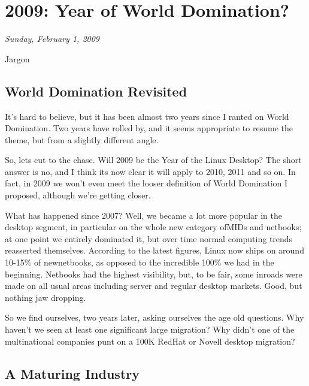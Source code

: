 \documentclass{memoir}
\begin{document}
\chapter{2009: Year of World Domination?}

\begin{flushright}
  \emph{Sunday, February 1, 2009}
\end{flushright}

\begin{epigraphs}
      {Jargon}
\end{epigraphs}

\section{World Domination Revisited}

It's hard to believe, but it has been almost two years since I ranted
on World Domination. Two years have rolled by, and it seems
appropriate to resume the theme, but from a slightly different angle.

So, lets cut to the chase. Will 2009 be the Year of the Linux Desktop?
The short answer is no, and I think its now clear it will apply to
2010, 2011 and so on. In fact, in 2009 we won't even meet the looser
definition of World Domination I proposed, although we're getting
closer.

What has happened since 2007? Well, we became a lot more popular in
the desktop segment, in particular on the whole new category ofMIDs
and netbooks; at one point we entirely dominated it, but over time
normal computing trends reasserted themselves. According to the latest
figures, Linux now ships on around 10-15\% of newnetbooks, as opposed
to the incredible 100\% we had in the beginning. Netbooks had the
highest visibility, but, to be fair, some inroads were made on all
usual areas including server and regular desktop markets. Good, but
nothing jaw dropping.

So we find ourselves, two years later, asking ourselves the age old
questions. Why haven't we seen at least one significant large
migration? Why didn't one of the multinational companies punt on a
100K RedHat or Novell desktop migration?

\section{A Maturing Industry}
\end{document}
